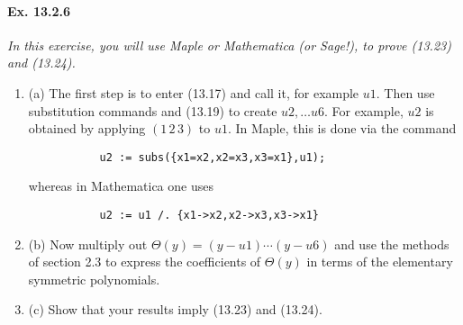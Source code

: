 \documentclass[11pt,a4paper]{article}
\newcommand{\be} {\begin{enumerate}}
\newcommand{\ee} {\end{enumerate}}
\begin{document}
\paragraph{Ex. 13.2.6}

{\it In this exercise, you will use Maple or Mathematica (or Sage!), to prove (13.23) and (13.24).
\be
\item[(a)] The first step is to enter (13.17) and call it, for example $u1$. Then use substitution commands and (13.19) to create $u2,\ldots u6$. For example, $u2$ is obtained by applying $(1\,2\,3)$ to $u1$. In Maple, this is done via the command

\begin{verbatim}
           u2 := subs({x1=x2,x2=x3,x3=x1},u1);
\end{verbatim}
whereas in Mathematica one uses
\begin{verbatim}
           u2 := u1 /. {x1->x2,x2->x3,x3->x1}
\end{verbatim}
\item[(b)] Now multiply out $\Theta(y) = (y-u1)\cdots(y-u6)$ and use the methods of section 2.3 to express the coefficients of $\Theta(y)$ in terms of the elementary symmetric polynomials.
\item[(c)] Show that your results imply (13.23) and (13.24).
\ee
}
\end{document}
